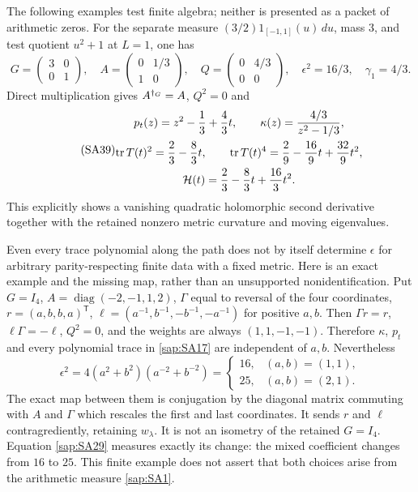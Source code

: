 The following examples test finite algebra; neither
is presented as a packet of arithmetic zeros.
For the separate measure $(3/2)1_{[-1,1]}(u)\,du$,
mass $3$, and test quotient $u^2+1$ at $L=1$, one has
\begin{equation}\tag{SA38}\label{sap:SA38}
G=\begin{pmatrix}3&0\\0&1\end{pmatrix},\quad
A=\begin{pmatrix}0&1/3\\1&0\end{pmatrix},\quad
Q=\begin{pmatrix}0&4/3\\0&0\end{pmatrix},\quad
\epsilon^2=16/3,\quad\gamma_1=4/3 .
\end{equation}
Direct multiplication gives $A^{\dagger_G}=A$, $Q^2=0$ and
\begin{equation}\tag{SA39}\label{sap:SA39}
\begin{gathered}
p_t(z)=z^2-\frac13+\frac43t,\qquad
\kappa(z)=\frac{4/3}{z^2-1/3},\\
\operatorname{tr} T(t)^2=\frac23-\frac83t,\qquad
\operatorname{tr} T(t)^4=\frac29-\frac{16}{9}t+\frac{32}{9}t^2,\\
\mathcal H(t)=\frac23-\frac83t+\frac{16}{3}t^2.
\end{gathered}
\end{equation}
This explicitly shows a vanishing quadratic holomorphic
second derivative together with the retained nonzero
metric curvature and moving eigenvalues.

Even every trace polynomial along the path does not by
itself determine $\epsilon$ for arbitrary parity-respecting
finite data with a fixed metric. Here is an exact example
and the missing map, rather than an unsupported
nonidentification. Put $G=I_4$,
$A=\operatorname{diag}(-2,-1,1,2)$,
$\Gamma$ equal to reversal of the four coordinates,
$r=(a,b,b,a)^{\mathsf T}$,
$\ell=(a^{-1},b^{-1},-b^{-1},-a^{-1})$ for positive
$a,b$. Then $\Gamma r=r$, $\ell\Gamma=-\ell$,
$Q^2=0$, and the weights are always $(1,1,-1,-1)$.
Therefore $\kappa$, $p_t$ and every polynomial trace
in \eqref{sap:SA17} are independent of $a,b$. Nevertheless
\begin{equation}\tag{SA40}\label{sap:SA40}
\epsilon^2
=4(a^2+b^2)(a^{-2}+b^{-2})
=\begin{cases}16,&(a,b)=(1,1),\\25,&(a,b)=(2,1).\end{cases}
\end{equation}
The exact map between them is conjugation by the
diagonal matrix commuting with $A$ and $\Gamma$ which
rescales the first and last coordinates. It sends $r$
and $\ell$ contragrediently, retaining $w_\lambda$.
It is not an isometry of the retained $G=I_4$.
Equation \eqref{sap:SA29} measures exactly its change:
the mixed coefficient changes from $16$ to $25$.
This finite example does not assert that both choices
arise from the arithmetic measure \eqref{sap:SA1}.

